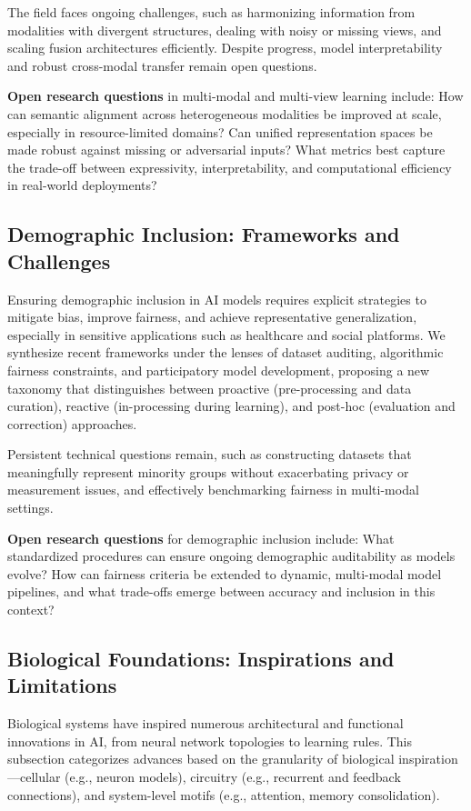 \documentclass[sigconf]{acmart}
\begin{document}
The field faces ongoing challenges, such as harmonizing information from modalities with divergent structures, dealing with noisy or missing views, and scaling fusion architectures efficiently. Despite progress, model interpretability and robust cross-modal transfer remain open questions.

\textbf{Open research questions} in multi-modal and multi-view learning include: How can semantic alignment across heterogeneous modalities be improved at scale, especially in resource-limited domains? Can unified representation spaces be made robust against missing or adversarial inputs? What metrics best capture the trade-off between expressivity, interpretability, and computational efficiency in real-world deployments?

\subsection{Demographic Inclusion: Frameworks and Challenges}

Ensuring demographic inclusion in AI models requires explicit strategies to mitigate bias, improve fairness, and achieve representative generalization, especially in sensitive applications such as healthcare and social platforms. We synthesize recent frameworks under the lenses of dataset auditing, algorithmic fairness constraints, and participatory model development, proposing a new taxonomy that distinguishes between proactive (pre-processing and data curation), reactive (in-processing during learning), and post-hoc (evaluation and correction) approaches.

Persistent technical questions remain, such as constructing datasets that meaningfully represent minority groups without exacerbating privacy or measurement issues, and effectively benchmarking fairness in multi-modal settings.

\textbf{Open research questions} for demographic inclusion include: What standardized procedures can ensure ongoing demographic auditability as models evolve? How can fairness criteria be extended to dynamic, multi-modal model pipelines, and what trade-offs emerge between accuracy and inclusion in this context?

\subsection{Biological Foundations: Inspirations and Limitations}

Biological systems have inspired numerous architectural and functional innovations in AI, from neural network topologies to learning rules. This subsection categorizes advances based on the granularity of biological inspiration—cellular (e.g., neuron models), circuitry (e.g., recurrent and feedback connections), and system-level motifs (e.g., attention, memory consolidation).
\end{document}
